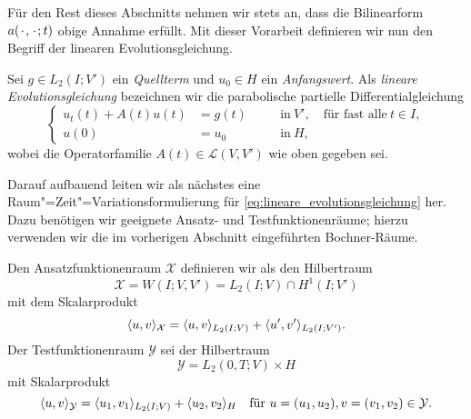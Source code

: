 Für den Rest dieses Abschnitts nehmen wir stets an, dass die Bilinearform $a({\mkern2mu\cdot\mkern2mu}, {\mkern2mu\cdot\mkern2mu}; t)$ obige Annahme erfüllt.
Mit dieser Vorarbeit definieren wir nun den Begriff der linearen Evolutionsgleichung.

\begin{Definition}
\label{definition:lineare_evolutionsgleichung}
    Sei $g \in L_{2}(I; V')$ ein \emph{Quellterm} und $u_{0} \in H$ ein \emph{Anfangswert}.
    Als \emph{lineare Evolutionsgleichung} bezeichnen wir die parabolische partielle Differentialgleichung
    \begin{equation}
        \label{eq:lineare_evolutionsgleichung}
        \left\{
        \begin{aligned}
            u_{t}(t) + A(t) u(t) &= g(t)     \quad&&\text{in}~V', \quad \text{für fast alle}~t \in I, \\
            u(0) &= u_{0}                    \quad&&\text{in}~H,
        \end{aligned}
        \right.
    \end{equation}
    wobei die  Operatorfamilie $A(t) \in \mathcal L(V, V')$ wie oben gegeben sei.
\end{Definition}

Darauf aufbauend leiten wir als nächstes eine Raum"=Zeit"=Variationsformulierung für \cref{eq:lineare_evolutionsgleichung} her.
Dazu benötigen wir geeignete Ansatz- und Testfunktionenräume; hierzu verwenden wir die im vorherigen Abschnitt eingeführten Bochner-Räume.

\begin{Definition}
\label{definition:ansatz_und_testraum}
    Den Ansatzfunktionenraum $\mathcal X$ definieren wir als den Hilbertraum
    \begin{equation}
    \label{eq:ansatzraum_X}
        \mathcal X = W(I; V, V') = L_{2}(I; V) \cap H^{1}(I; V')
    \end{equation}
    mit dem Skalarprodukt
    \begin{equation}
    \label{eq:ansatzraum_skalarprodukt}
        \langle u,v\rangle_{\mathcal X} = \langle u,v\rangle_{L_{2}(I; V)} + \langle u',v'\rangle_{L_{2}(I; V')}.
    \end{equation}
    Der Testfunktionenraum $\mathcal Y$ sei der Hilbertraum
    \begin{equation}
    \label{eq:testraum_Y}
        \mathcal Y = L_{2}(0, T; V) \times H
    \end{equation}
    mit Skalarprodukt
    \begin{equation}
        \label{eq:testraum_skalarprodukt}
        \langle u,v\rangle_{\mathcal Y} = \langle u_{1},v_{1}\rangle_{L_{2}(I; V)} + \langle u_{2},v_{2}\rangle_{H} \quad \text{für } u = (u_{1}, u_{2}), v = (v_{1}, v_{2}) \in \mathcal Y.
    \end{equation}
\end{Definition}


